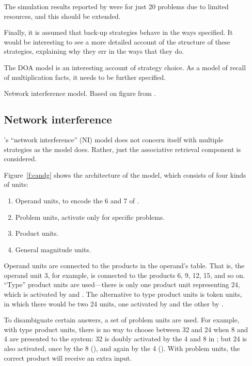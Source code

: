 The simulation results reported by  were for just 20
problems due to limited resources, and this should be extended.

Finally, it is assumed that back-up strategies behave in the ways
specified. It would be interesting to see a more detailed account of the
structure of these strategies, explaining why they err in the ways that
they do.

The DOA model is an interesting account of strategy choice.  As a model of
recall of multiplication facts, it needs to be further specified.



\begin{fancyfigure}
\centerline{}
\caption{Network interference model.  Based on figure from
\protect{}.}\label{f:candg}
\end{fancyfigure}

\subsection{Network interference}

\citeauthor{camp85}'s \citeyear{camp85} ``network
interference'' (NI) model does not
concern itself with multiple strategies as the \citeauthor{siegmult}
model does. Rather, just the associative retrieval component is
considered.

Figure~\ref{f:candg} shows the architecture of the model, which consists
of four kinds of units:
\begin{enumerate}
\item Operand units, to encode the 6 and 7 of .
\item Problem units, activate only for specific problems.
\item Product units.
\item General magnitude units.
\end{enumerate}
Operand units are connected to the products in the operand's table. That
is, the operand unit 3, for example, is connected to the products 6, 9, 12,
15, and so on.  ``Type'' product units are used---there is only
one product unit representing 24, which is activated by  and .
The alternative to type product units is token units, in which there
would be two 24 units, one activated by  and the other by .

To disambiguate certain answers, a set of problem units are used.  For
example, with type product units, there is no way to choose between 32
and 24 when 8 and 4 are presented to the system: 32 is doubly activated
by the 4 and 8 in ; but 24 is also activated, once by the 8
(),
and again by the 4 ().
With problem units, the correct product will
receive an extra input.

